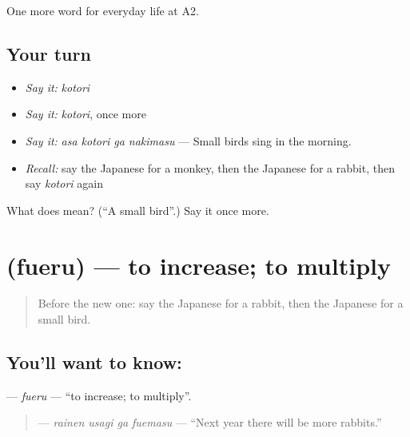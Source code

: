 \begin{grammarlens}[title={What you've built}]
One more word for everyday life at A2.
\end{grammarlens}

\subsection*{Your turn}
\begin{itemize}
\raggedright
  \item \emph{Say it:} \emph{kotori}
  \item \emph{Say it:} \emph{kotori}, once more
  \item \emph{Say it:} \emph{asa kotori ga nakimasu} — Small birds sing in the morning.
  \item \emph{Recall:} say the Japanese for a monkey, then the Japanese for a rabbit, then say \emph{kotori} again
\end{itemize}

\begin{tcolorbox}[breakable,colback=teal!4,colframe=teal!35!black,title={Before you move on}]
What does  mean? (\textquotedblleft{}A small bird\textquotedblright{}.) Say it once more.
\end{tcolorbox}
\section[\texorpdfstring{\ja{ふえる} (fueru)}{ふえる (fueru)}]{ (fueru) — to increase; to multiply}

\label{lesson:JA-C211-fueru}



\begin{quote}
Before the new one: say the Japanese for a rabbit, then the Japanese for a small bird.
\end{quote}

\subsection*{You'll want to know: }
\textbf{} — \emph{fueru} — \textquotedblleft{}to increase; to multiply\textquotedblright{}.

\begin{quote}
\textbf{  } — \emph{rainen usagi ga fuemasu} — \textquotedblleft{}Next year there will be more rabbits.\textquotedblright{}
\end{quote}

